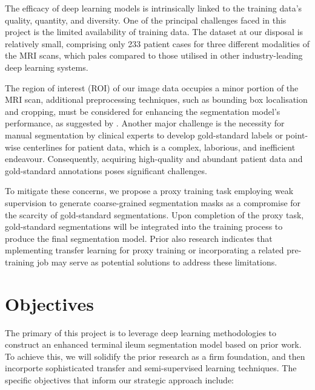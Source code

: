 The efficacy of deep learning models is intrinsically linked to the training data's quality, quantity, and diversity. One of the principal challenges faced in this project is the limited availability of training data. The dataset at our disposal is relatively small, comprising only 233 patient cases for three different modalities of the MRI scans, which pales compared to those utilised in other industry-leading deep learning systems. 

The region of interest (ROI) of our image data occupies a minor portion of the MRI scan, additional preprocessing techniques, such as bounding box localisation and cropping, must be considered for enhancing the segmentation model's performance, as suggested by \cite{Ali2022}. Another major challenge is the necessity for manual segmentation by clinical experts to develop gold-standard labels or point-wise centerlines for patient data, which is a complex, laborious, and inefficient endeavour. Consequently, acquiring high-quality and abundant patient data and gold-standard annotations poses significant challenges.

To mitigate these concerns, we propose a proxy training task employing weak supervision to generate coarse-grained segmentation masks as a compromise for the scarcity of gold-standard segmentations. Upon completion of the proxy task, gold-standard segmentations will be integrated into the training process to produce the final segmentation model. Prior also research \cite{Ali2022} indicates that mplementing transfer learning for proxy training \cite{jang2021effectiveness} or incorporating a related pre-training job may serve as potential solutions to address these limitations.

\section{Objectives}

The primary of this project is to leverage deep learning methodologies to construct an enhanced terminal ileum segmentation model based on prior work. To achieve this, we will solidify the prior research as a firm foundation, and then incorporte sophisticated transfer and semi-supervised learning techniques. The specific objectives that inform our strategic approach include:


